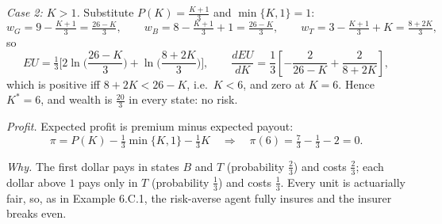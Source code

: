 \documentclass[12pt,letterpaper]{article}
\begin{document}
\textit{Case 2: $K>1$.} Substitute $P(K)=\tfrac{K+1}{3}$ and $\min\{K,1\}=1$:
\[
w_G=9-\tfrac{K+1}{3}=\tfrac{26-K}{3},\qquad
w_B=8-\tfrac{K+1}{3}+1=\tfrac{26-K}{3},\qquad
w_T=3-\tfrac{K+1}{3}+K=\tfrac{8+2K}{3},
\]
so
\[
EU=\tfrac13\Big[2\ln\Big(\frac{26-K}{3}\Big)+\ln\Big(\frac{8+2K}{3}\Big)\Big],
\qquad
\frac{dEU}{dK}=\frac13\left[-\frac{2}{26-K}+\frac{2}{8+2K}\right],
\]
which is positive iff $8+2K<26-K$, i.e.\ $K<6$, and zero at $K=6$. Hence $K^*=6$, and wealth is $\tfrac{20}{3}$ in every state: no risk.

\textit{Profit.} Expected profit is premium minus expected payout:
\[
\pi=P(K)-\tfrac13\min\{K,1\}-\tfrac13K
\quad\Rightarrow\quad
\pi(6)=\tfrac73-\tfrac13-2=0 .
\]

\textit{Why.} The first dollar pays in states $B$ and $T$ (probability $\tfrac23$) and costs $\tfrac23$; each dollar above $1$ pays only in $T$ (probability $\tfrac13$) and costs $\tfrac13$. Every unit is actuarially fair, so, as in Example 6.C.1, the risk-averse agent fully insures and the insurer breaks even.
\end{document}
